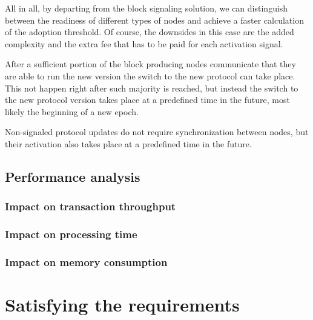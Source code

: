 \documentclass[11pt,a4paper]{article}
\begin{document}
All in all, by departing from the block signaling solution, we can distinguish
between the readiness of different types of nodes and achieve a faster
calculation of the adoption threshold. Of course, the downsides in this case are
the added complexity and the extra fee that has to be paid for each activation
signal.

After a sufficient portion of the block producing nodes communicate that they
are able to run the new version the switch to the new protocol can take place.
This not happen right after such majority is reached, but instead the switch to
the new protocol version takes place at a predefined time in the future, most
likely the beginning of a new epoch.

Non-signaled protocol updates do not require synchronization between nodes, but
their activation also takes place at a predefined time in the future.



\subsection{Performance analysis}
\label{sec:performance-analysis}

\subsubsection{Impact on transaction throughput}
\label{sec:impact-trans-thro}

\subsubsection{Impact on processing time}
\label{sec:impact-proc-time}

\subsubsection{Impact on memory consumption}
\label{sec:impact-memory-cons}

\section{Satisfying the requirements}
\label{sec:satisfy-requ}
\end{document}
